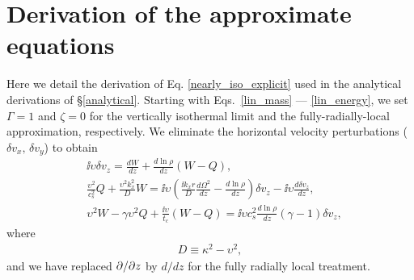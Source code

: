 \section{Derivation of the approximate equations}\label{adia_improve}
Here we detail the derivation of Eq. \ref{nearly_iso_explicit} used in the 
analytical derivations of \S\ref{analytical}.  Starting with Eqs.\ \ref{lin_mass} --- \ref{lin_energy},
we set $\Gamma = 1$ and $\zeta = 0$ for the vertically isothermal limit and the fully-radially-local 
approximation, respectively.  We  eliminate
the horizontal velocity perturbations ($\delta v_x,\, \delta v_y$) to
obtain  
\begin{subequations}\label{A1}\begin{align}
  & \ii\upsilon\delta v_z = \frac{dW}{dz} + \frac{d\ln{\rho}}{d z}\left(W-Q\right),\label{ode_vz} \\
  &\frac{\upsilon^2}{c_s^2}Q + \frac{\upsilon^2k_x^2}{D}W =\ii\upsilon \left(\frac{\ii
      k_x r}{D}\frac{d\Omega^2}{dz} -
    \frac{d\ln{\rho}}{dz}\right)\delta v_z - \ii\upsilon \frac{d\delta v_z}{dz},
  \label{ode_w}\\
  &\upsilon^2W - \gamma\upsilon^2 Q +
  \frac{\ii\upsilon}{t_c}\left(W-Q\right) 
  =\ii \upsilon c_s^2\frac{d\ln{\rho}}{dz}\left(\gamma -
    1\right)\delta v_z,
  \label{ode_Q} 
\end{align}\end{subequations}
where
\begin{align}
  D \equiv \kappa^2 - \upsilon^2,
\end{align} 
and we have replaced $\partial/\partial z$ by $d/dz$ for the fully radially local treatment. 

